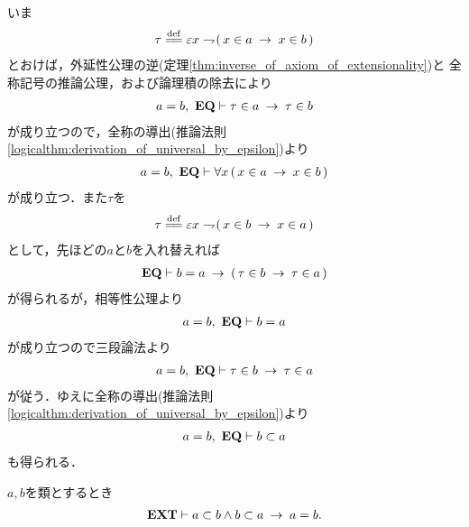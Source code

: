	\begin{sketch}
		いま
		\begin{align}
			\tau \defeq \varepsilon x \negation (\, x \in a \rarrow x \in b\, )
		\end{align}
		とおけば，外延性公理の逆(定理\ref{thm:inverse_of_axiom_of_extensionality})と
		全称記号の推論公理，および論理積の除去により
		\begin{align}
			a = b,\ \mbox{{\bf EQ}} \vdash \tau \in a \hspace{0.25em}\rightarrow\hspace{0.25em} \tau \in b
		\end{align}
		が成り立つので，全称の導出(推論法則\ref{logicalthm:derivation_of_universal_by_epsilon})より
		\begin{align}
			a = b,\ \mbox{{\bf EQ}} \vdash \forall x\, (\, x \in a \hspace{0.25em}\rightarrow\hspace{0.25em} x \in b\, )
		\end{align}
		が成り立つ．また$\tau$を
		\begin{align}
			\tau \defeq \varepsilon x \negation (\, x \in b \rarrow x \in a\, )
		\end{align}
		として，先ほどの$a$と$b$を入れ替えれば
		\begin{align}
			\mbox{{\bf EQ}} \vdash b = a \hspace{0.25em}\rightarrow\hspace{0.25em} (\, \tau \in b \hspace{0.25em}\rightarrow\hspace{0.25em} \tau \in a\, )
		\end{align}
		が得られるが，相等性公理より
		\begin{align}
			a = b,\ \mbox{{\bf EQ}} \vdash b = a
		\end{align}
		が成り立つので三段論法より
		\begin{align}
			a = b,\ \mbox{{\bf EQ}} \vdash \tau \in b \hspace{0.25em}\rightarrow\hspace{0.25em} \tau \in a
		\end{align}
		が従う．ゆえに全称の導出(推論法則\ref{logicalthm:derivation_of_universal_by_epsilon})より
		\begin{align}
			a = b,\ \mbox{{\bf EQ}} \vdash b \subset a
		\end{align}
		も得られる．
		\QED
	\end{sketch}
	
	\begin{screen}
		\begin{thm}[互いに相手を包含する類同士は等しい]
		\label{thm:mutually_including_classes_are_equivalent}
			$a,b$を類とするとき
			\begin{align}
				\mbox{{\bf EXT}} \vdash a \subset b \wedge b \subset a \hspace{0.25em}\rightarrow\hspace{0.25em} a = b.
			\end{align}
		\end{thm}
	\end{screen}
	
